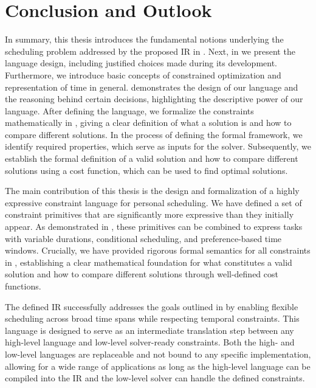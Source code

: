 \cleardoubleoddpage%
\chapter{Conclusion and Outlook}
\label{chapter:conclusion}
In summary, this thesis introduces the fundamental notions underlying the scheduling problem addressed by the proposed \ac{IR} in . Next, in  we present the language design, including justified choices made during its development. Furthermore, we introduce basic concepts of constrained optimization and representation of time in general.  demonstrates the design of our language and the reasoning behind certain decisions, highlighting the descriptive power of our language. After defining the language, we formalize the constraints mathematically in , giving a clear definition of what a solution is and how to compare different solutions. In the process of defining the formal framework, we identify required properties, which serve as inputs for the solver. Subsequently, we establish the formal definition of a valid solution and how to compare different solutions using a cost function, which can be used to find optimal solutions.

The main contribution of this thesis is the design and formalization of a highly expressive constraint language for personal scheduling. We have defined a set of constraint primitives that are significantly more expressive than they initially appear. As demonstrated in , these primitives can be combined to express tasks with variable durations, conditional scheduling, and preference-based time windows. Crucially, we have provided rigorous formal semantics for all constraints in , establishing a clear mathematical foundation for what constitutes a valid solution and how to compare different solutions through well-defined cost functions.

The defined \ac{IR} successfully addresses the goals outlined in  by enabling flexible scheduling across broad time spans while respecting temporal constraints. This language is designed to serve as an intermediate translation step between any high-level language and low-level solver-ready constraints. Both the high- and low-level languages are replaceable and not bound to any specific implementation, allowing for a wide range of applications as long as the high-level language can be compiled into the \ac{IR} and the low-level solver can handle the defined constraints.

